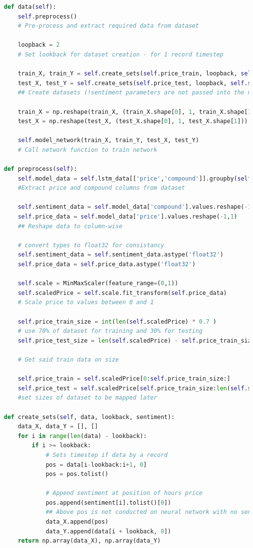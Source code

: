 \documentclass[oneside, 12pt]{article}
\begin{document}
		\begin{lstlisting}[language=python, caption=Dataset creation and preprocessing]
def data(self):
	self.preprocess()
	# Pre-process and extract required data from dataset
	
	loopback = 2
	# Set lookback for dataset creation - for 1 record timestep
	
	train_X, train_Y = self.create_sets(self.price_train, loopback, self.sentiment_data[0:self.price_train_size])
	test_X, test_Y = self.create_sets(self.price_test, loopback, self.sentiment_data[self.price_train_size:len(self.scaledPrice)])
	## Create datasets (!sentiment parameters are not passed into the neural network the doesn't embedded the sentiment alongside price data!)
	
	train_X = np.reshape(train_X, (train_X.shape[0], 1, train_X.shape[1]))
	test_X = np.reshape(test_X, (test_X.shape[0], 1, test_X.shape[1]))
	
	self.model_network(train_X, train_Y, test_X, test_Y)
	# Call network function to train network

def preprocess(self):
	self.model_data = self.lstm_data[['price','compound']].groupby(self.lstm_data['created_at']).mean()
	#Extract price and compound columns from dataset
	
	self.sentiment_data = self.model_data['compound'].values.reshape(-1,1)
	self.price_data = self.model_data['price'].values.reshape(-1,1)
	## Reshape data to column-wise
	
	# convert types to float32 for consistancy
	self.sentiment_data = self.sentiment_data.astype('float32')
	self.price_data = self.price_data.astype('float32')
	
	self.scale = MinMaxScaler(feature_range=(0,1))
	self.scaledPrice = self.scale.fit_transform(self.price_data)
	# Scale price to values between 0 and 1
	
	self.price_train_size = int(len(self.scaledPrice) * 0.7 )            
	# use 70% of dataset for training and 30% for testing
	self.price_test_size = len(self.scaledPrice) - self.price_train_size
	
	# Get said train data on size
	
	self.price_train = self.scaledPrice[0:self.price_train_size:]
	self.price_test = self.scaledPrice[self.price_train_size:len(self.scaledPrice):]
	#set sizes of dataset to be mapped later
	
def create_sets(self, data, lookback, sentiment):
	data_X, data_Y = [], []
	for i in range(len(data) - lookback):
		if i >= lookback:
			# Sets timestep if data by a record
			pos = data[i-lookback:i+1, 0]
			pos = pos.tolist()
	
			# Append sentiment at position of hours price
			pos.append(sentiment[i].tolist()[0])
			## Above pos is not conducted on neural network with no sentiment embedded pos.append(0) occurs instead
			data_X.append(pos)
			data_Y.append(data[i + lookback, 0])
	return np.array(data_X), np.array(data_Y)
		\end{lstlisting}
		
\end{document}

